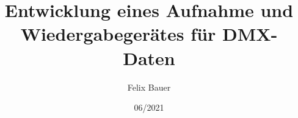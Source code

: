 \documentclass[12p, a4paper]{article}
\begin{document}
\title{Entwicklung eines Aufnahme und Wiedergabegerätes für DMX-Daten}
\author{Felix Bauer}
\date{06/2021}
\maketitle
\end{document}
